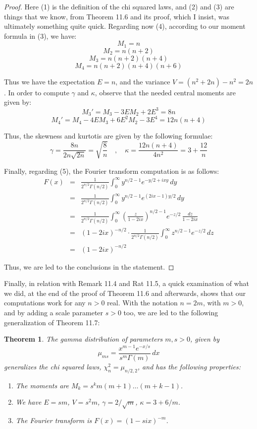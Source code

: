 \documentclass[12pt]{amsbook}
\newtheorem{theorem}{Theorem}[chapter]
\begin{document}
\begin{proof}
Here (1) is the definition of the chi squared laws, and (2) and (3) are things that we know, from Theorem 11.6 and its proof, which I insist, was ultimately something quite quick. Regarding now (4), according to our moment formula in (3), we have:
$$M_1=n$$
$$M_2=n(n+2)$$
$$M_3=n(n+2)(n+4)$$
$$M_4=n(n+2)(n+4)(n+6)$$

Thus we have the expectation $E=n$, and the variance $V=(n^2+2n)-n^2=2n$. In order to compute $\gamma$ and $\kappa$, observe that the needed central moments are given by:
$$M_3'=M_3-3EM_2+2E^3=8n$$
$$M_4'=M_4-4EM_3+6E^2M_2-3E^4=12n(n+4)$$

Thus, the skewness and kurtotis are given by the following formulae:
$$\gamma=\frac{8n}{2n\sqrt{2n}}=\sqrt{\frac{8}{n}}\quad,\quad\kappa=\frac{12n(n+4)}{4n^2}=3+\frac{12}{n}$$

Finally, regarding (5), the Fourier transform computation is as follows:
\begin{eqnarray*}
F(x)
&=&\frac{1}{2^{n/2}\Gamma(n/2)}\int_0^\infty y^{n/2-1}e^{-y/2+ixy}\,dy\\
&=&\frac{1}{2^{n/2}\Gamma(n/2)}\int_0^\infty y^{n/2-1}e^{(2ix-1)y/2}\,dy\\
&=&\frac{1}{2^{n/2}\Gamma(n/2)}\int_0^\infty\left(\frac{z}{1-2ix}\right)^{n/2-1}e^{-z/2}\,\frac{dz}{1-2ix}\\
&=&(1-2ix)^{-n/2}\cdot\frac{1}{2^{n/2}\Gamma(n/2)}\int_0^\infty z^{n/2-1}e^{-z/2}\,dz\\
&=&(1-2ix)^{-n/2}
\end{eqnarray*}

Thus, we are led to the conclusions in the statement.
\end{proof}

Finally, in relation with Remark 11.4 and Rat 11.5, a quick examination of what we did, at the end of the proof of Theorem 11.6 and afterwards, shows that our computations work for any $n>0$ real. With the notation $n=2m$, with $m>0$, and by adding a scale parameter $s>0$ too, we are led to the following generalization of Theorem 11.7:

\begin{theorem}
The gamma distribution of parameters $m,s>0$, given by
$$\mu_{ms}=\frac{x^{m-1}e^{-x/s}}{s^m\Gamma(m)}\,dx$$
generalizes the chi squared laws, $\chi^2_n=\mu_{n/2,2}$, and has the following properties: 
\begin{enumerate}
\item The moments are $M_k=s^km(m+1)\ldots(m+k-1)$.

\item We have $E=sm$, $V=s^2m$, $\gamma=2/\sqrt{m}$, $\kappa=3+6/m$.

\item The Fourier transform is $F(x)=(1-six)^{-m}$.
\end{enumerate}
\end{theorem}
\end{document}
